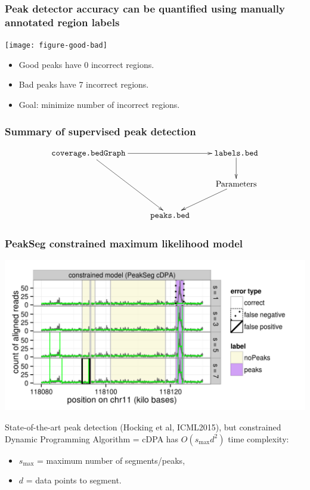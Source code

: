 \documentclass{beamer}
\begin{document}
\begin{frame}
  \frametitle{Peak detector accuracy can be quantified using manually
    annotated region labels}
  
  \texttt{[image: figure-good-bad]}

  \begin{itemize}
  \item Good peaks have 0 incorrect regions.
  \item Bad peaks have 7 incorrect regions.
  \item Goal: minimize number of incorrect regions.
  \end{itemize}

\end{frame}

\begin{frame}
  \frametitle{Summary of supervised peak detection}
  \begin{displaymath}
  \xymatrix{
    \texttt{coverage.bedGraph}
    \ar [ddr] 
    \ar [rr]
    & & \texttt{labels.bed} \ar [d]
    \\
    & \text{ }
    & \text{Parameters} 
    \ar [dl]
    \\
    & \texttt{peaks.bed}
  }
  \end{displaymath}
  
\end{frame}

\begin{frame}
  \frametitle{PeakSeg constrained maximum likelihood model}
  \includegraphics[width=\textwidth]{figure-Segmentor-PeakSeg-constrained-regions}

  State-of-the-art peak detection (Hocking et al, ICML2015), but
  constrained Dynamic Programming Algorithm = cDPA has
  $O(s_{\text{max}} d^2)$ time complexity:
  \begin{itemize}
  \item $s_{\text{max}}$ = maximum number of segments/peaks,
  \item $d$ = data points to segment.
  \end{itemize}
\end{frame}
\end{document}
